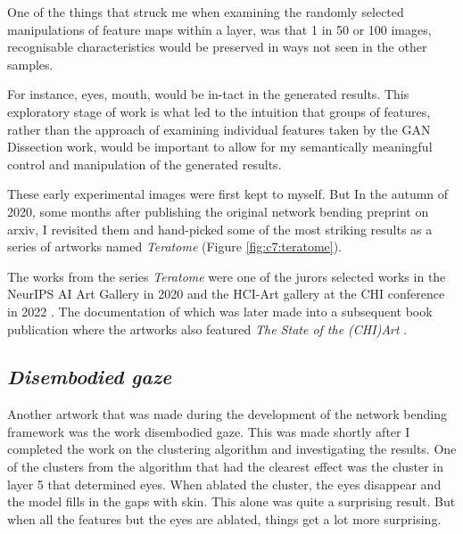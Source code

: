 One of the things that struck me when examining the randomly selected manipulations of feature maps within a layer, was that 1 in 50 or 100 images, recognisable characteristics would be preserved in ways not seen in the other samples. 

For instance, eyes, mouth, would be in-tact in the generated results. This exploratory stage of work is what led to the intuition that groups of features, rather than the approach of examining individual features taken by the GAN Dissection work, would be important to allow for my semantically meaningful control and manipulation of the generated results. 

These early experimental images were first kept to myself. 
But In the autumn of 2020, some months after publishing the original network bending preprint on arxiv, I revisited them and hand-picked some of the most striking results as a series of artworks named \textit{Teratome} (Figure \ref{fig:c7:teratome}). 

The works from the series \textit{Teratome} were one of the jurors selected works in the NeurIPS AI Art Gallery in 2020 \citep{broad2020teratome} and the HCI-Art gallery at the CHI conference in 2022 \citep{perry2022art} . 
The documentation of which was later made into a subsequent book publication where the artworks also featured \textit{The State of the (CHI)Art} \citep{sturdee2023chiart}. 

\subsection{\textit{Disembodied gaze}}

Another artwork that was made during the development of the network bending framework was the work disembodied gaze. 
This was made shortly after I completed the work on the clustering algorithm and investigating the results. 
One of the clusters from the algorithm that had the clearest effect was the cluster in layer 5 that determined eyes. 
When ablated the cluster, the eyes disappear and the model fills in the gaps with skin. 
This alone was quite a surprising result. But when all the features but the eyes are ablated, things get a lot more surprising. 


